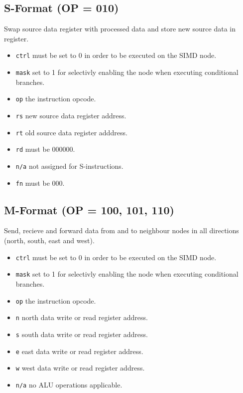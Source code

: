 \subsection[S-Format]{S-Format (OP = 010)}
Swap source data register with processed data and store new source data in
register.



\begin{itemize}
\item {\tt ctrl} must be set to 0 in order to be executed on the SIMD node.
\item {\tt mask} set to 1 for selectivly enabling the node when executing
  conditional branches.
\item {\tt op} the instruction opcode.
\item {\tt rs} new source data register address.
\item {\tt rt} old source data register adddress.
\item {\tt rd} must be 000000.
\item {\tt n/a} not assigned for S-instructions.
\item {\tt fn} must be 000.
\end{itemize}



\subsection[M-Format]{M-Format (OP = 100, 101, 110)}
Send, recieve and forward data from and to neighbour nodes in all directions (north, south, east and west).



\begin{itemize}
\item {\tt ctrl} must be set to 0 in order to be executed on the SIMD node.
\item {\tt mask} set to 1 for selectivly enabling the node when executing
  conditional branches.
\item {\tt op} the instruction opcode.
\item {\tt n} north data write or read register address.
\item {\tt s} south data write or read register address.
\item {\tt e} east data write or read register address.
\item {\tt w} west data write or read register address.
\item {\tt n/a} no ALU operations applicable.
\end{itemize}


